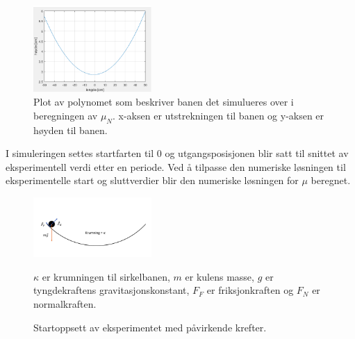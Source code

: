 \begin{figure}[h!] 
\centering
\includegraphics[width=0.4\textwidth]{Rapport/polynomFiksa.png}
\caption{Plot av polynomet som beskriver banen det simulueres over i beregningen av $\mu_N$. x-aksen er utstrekningen til banen og y-aksen er høyden til banen.}
\label{fig:poly} %
\end{figure}
I simuleringen settes startfarten til 0 og utgangsposisjonen blir satt til snittet av eksperimentell verdi etter en periode.
Ved å tilpasse den numeriske løsningen til eksperimentelle start og sluttverdier blir den numeriske løsningen for $\mu$ beregnet. 
\FloatBarrier
\begin{figure}[h!] 
\centering
\includegraphics[width=0.4\textwidth]{Figur_til_lab.png}

\caption{Startoppsett av eksperimentet med påvirkende krefter.}
$\kappa$ er krumningen til sirkelbanen, $m$ er kulens masse, $g$ er tyngdekraftens gravitasjonskonstant, $F_F$ er friksjonkraften og $F_N$ er normalkraften.
\label{fig:pendel} %
\end{figure}
\FloatBarrier

